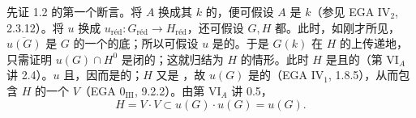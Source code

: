 先证 1.2 的第一个断言。将 $A$ 换成其 $k$ 的，便可假设 $A$ 是 $k$（参见 EGA IV$_2$, 2.3.12）。将 $u$ 换成 $u_{\mathrm{r\text{é}d}}:G_{\mathrm{r\text{é}d}}\to H_{\mathrm{r\text{é}d}}$，还可假设 $G,H$ 都。此时，如刚才所见，$\overline{u(G)}$ 是 $G$ 的一个的底；所以可假设 $u$ 是的。于是 $G(k)$ 在 $H$ 的上传递地，只需证明 $u(G)\cap H^0$ 是闭的；这就归结为 $H$ 的情形。此时 $H$ 是且的（第 VI$_A$ 讲 2.4）。$u$ 且，因而是的；$H$ 又是 ，故 $u(G)$ 是的（EGA IV$_1$, 1.8.5），从而包含 $H$ 的一个 $V$（EGA 0$_{\mathrm{III}}$, 9.2.2）。由第 VI$_A$ 讲 0.5，
\[
H=V\cdot V\subset u(G)\cdot u(G)=u(G).
\]

